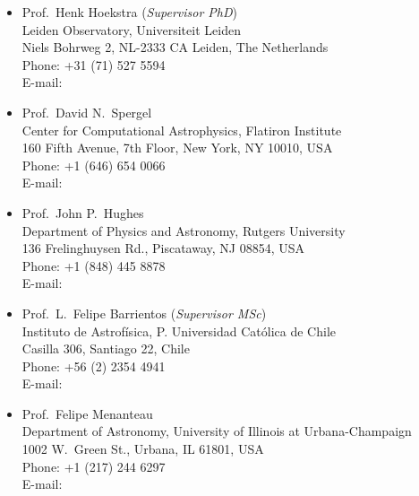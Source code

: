 \documentclass[11pt]{article}
\begin{document}
\begin{itemize}
 \item Prof.~Henk Hoekstra (\textit{Supervisor PhD})\\
       Leiden Observatory, Universiteit Leiden\\
       Niels Bohrweg 2, NL-2333 CA Leiden, The Netherlands\\
       Phone: +31 (71) 527 5594\\
       E-mail: 
 \item Prof.~David N.~Spergel\\
       Center for Computational Astrophysics, Flatiron Institute\\
       160 Fifth Avenue, 7th Floor, New York, NY 10010, USA\\
       Phone: +1 (646) 654 0066\\
       E-mail: 
 \item Prof.~John P.~Hughes\\
       Department of Physics and Astronomy, Rutgers University\\
       136 Frelinghuysen Rd., Piscataway, NJ 08854, USA\\
       Phone: +1 (848) 445 8878\\
       E-mail: 
 \item Prof.~L.~Felipe Barrientos (\textit{Supervisor MSc})\\
       Instituto de Astrof\'isica, P. Universidad Cat\'olica de Chile\\
       Casilla 306, Santiago 22, Chile\\
       Phone: +56 (2) 2354 4941\\
       E-mail: 
 \item Prof.~Felipe Menanteau\\
       Department of Astronomy, University of Illinois at Urbana-Champaign\\
       1002 W.\ Green St., Urbana, IL 61801, USA\\
       Phone: +1 (217) 244 6297\\
       E-mail: 
\end{itemize}

\vspace{0.3cm}
\hline




%
\end{document}

